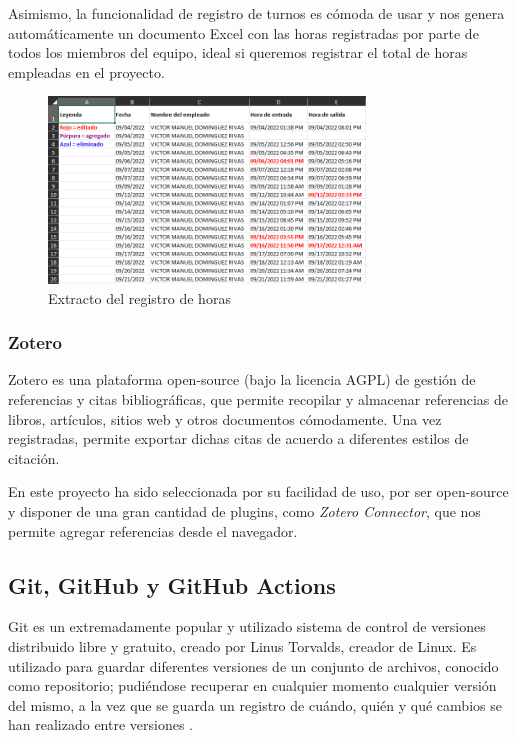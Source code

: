             Asimismo, la funcionalidad de registro de turnos es cómoda de usar y nos genera automáticamente un documento
            Excel con las horas registradas por parte de todos los miembros del equipo, ideal si queremos registrar el 
            total de horas empleadas en el proyecto. 

            \begin{figure}[h]
                \centering
                \includegraphics[width=0.75\textwidth]{figures/Teams excel.PNG}
                \caption{Extracto del registro de horas}
                \label{fig:teams:excel}
            \end{figure}
        

        \subsubsection{Zotero}
            Zotero es una plataforma open-source (bajo la licencia AGPL) de gestión de referencias y citas 
            bibliográficas, que permite recopilar y almacenar referencias de libros, artículos, sitios web y otros 
            documentos cómodamente. Una vez registradas, permite exportar dichas citas de acuerdo a diferentes estilos 
            de citación. 
                
            En este proyecto ha sido seleccionada por su facilidad de uso, por ser open-source y disponer de una gran 
            cantidad de plugins, como \textit{Zotero Connector}, que nos permite agregar referencias desde el navegador.
        
        \subsection{Git, GitHub y GitHub Actions}
            Git es un extremadamente popular y utilizado sistema de control de versiones distribuido libre y gratuito,
            creado por Linus Torvalds, creador de Linux. Es utilizado para guardar diferentes versiones
            de un conjunto de archivos, conocido como repositorio; pudiéndose recuperar en cualquier momento
            cualquier versión del mismo, a la vez que se guarda un registro de cuándo, quién y qué cambios se han 
            realizado entre versiones \cite{atlassian_software_nodate}.


